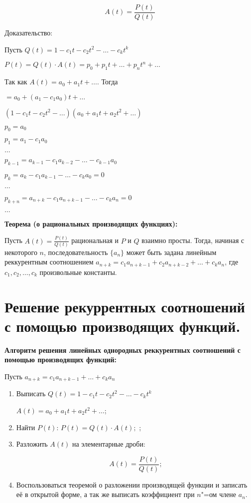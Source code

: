     \[
        A(t) = \frac{P(t)}{Q(t)}  
    \]
    \bigskip

    Доказательство:
    \bigskip

    Пусть $Q(t) = 1 - c_1t - c_2t^2 - \dots - c_kt^k$
    \smallskip

    $P(t) = Q(t) \cdot A(t) = p_0 + p_1t + \dots + p_nt^n + \dots$
    \smallskip

    Так как $A(t) = a_0 + a_1 t + \dots$. Тогда
    \smallskip

    $= a_0 + (a_1 - c_1a_0)t + \dots$
    \smallskip

    $(1 - c_1 t - c_2 t^2 - \dots)(a_0 + a_1 t + a_2 t^2 + \dots)$
    \smallskip

    $p_0 = a_0$
    \smallskip

    $p_1 = a_1 - c_1 a_0$
    \smallskip

    $\dots$
    \smallskip

    $p_{k - 1} = a_{k - 1} - c_1 a_{k - 2} - \dots - c_{k - 1}a_0$
    \smallskip

    $p_k = a_k - c_1 a_{k - 1} - \dots - c_k a_0 = 0$
    \smallskip

    $\dots$
    \smallskip

    $p_{k + n} = a_{n + k} - c_1 a_{n + k - 1} - \dots - c_k a_n = 0$
    \smallskip

    $\dots$
    \bigskip

\textbf{Теорема (о рациональных производящих функциях):}
    \smallskip
    
    Пусть $A(t) = \frac{P(t)}{Q(t)}$ рациональная и $P$ и $Q$ взаимно просты.
    Тогда, начиная с некоторого $n$, последовательность $\{a_n\}$ может
    быть задана линейным реккурентным соотношением $a_{n + k} =
    c_1 a_{n + k - 1} + c_2 a_{n + k - 2} + \dots + c_k a_n$,
    где $c_1, c_2, \dots, c_k$ произвольные константы.

\section{Решение рекуррентных соотношений с помощью производящих функций.}    

\textbf{Алгоритм решения линейных однородных реккурентных соотношений 
с помощью производящих функций:}
    \smallskip

    Пусть $a_{n + k} = c_1 a_{n + k - 1} + \dots + c_k a_n$
    
    \begin{enumerate}
        \item{Выписать $Q(t) = 1 - c_1t - c_2t^2 - \dots - c_kt^k$
        
        $A(t) = a_0 + a_1t + a_2t^2 + \dots$;}
        \item{Найти $P(t)$: $P(t) = Q(t) \cdot A(t);$ ;}
        \item{Разложить $A(t)$ на элементарные дроби:
        
        \[
            A(t) = \frac{P(t)}{Q(t)};  
        \]}
        \item{Воспользоваться теоремой о разложении производящей функции
        и записать её в открытой форме, а так же выписать коэффициент при
        $n$"=ом члене $a_n$.}
    \end{enumerate}

